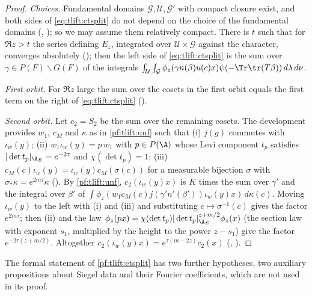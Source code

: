 \begin{proof}
\emph{Choices.} Fundamental domains $\mathcal G,\mathcal U,\mathcal G'$ with compact closure exist, and both sides of
\eqref{eq:tlift:ctsplit} do not depend on the choice of the fundamental domains
(,
); so we may assume them relatively compact. There is $t$
such that for $\Re z>t$ the series defining $E_z$, integrated over $\mathcal U\times\mathcal G$ against the character, converges
absolutely (); then the left side of
\eqref{eq:tlift:ctsplit} is the sum over $\gamma\in P(F)\backslash G(F)$ of the integrals
$\int_{\mathcal U}\int_{\mathcal G}\phi_z(\gamma n(\beta)u(c)x)\psi(-\Tr\tr(T\beta))\,d\lambda\,d\nu$.

\emph{First orbit.} For $\Re z$ large the sum over the cosets in the first orbit equals the first term on the right of
\eqref{eq:tlift:ctsplit} ().

\emph{Second orbit.} Let $c_2=S_2$ be the sum over the remaining cosets. The development provides $w_1$, $c_M$ and $\kappa$ as
in \cref{pf:tlift:unf} such that (i) $j(g)$ commutes with $\iota_w(y)$; (ii) $w_1\iota_w(y)=p\,w_1$ with $p\in P(\A)$ whose Levi
component $t_p$ satisfies $|\det t_p|_{\tliftAE}=e^{-2\tau}$ and $\chi(\det t_p)=1$; (iii) $c_M(c)\iota_w(y)=\iota_w(y)c_M(\sigma(c))$ for a
measurable bijection $\sigma$ with $\sigma_*\kappa=e^{2m\tau}\kappa$
(). By \cref{pf:tlift:unf}, $c_2(\iota_w(y)x)$ is $K$ times the
sum over $\gamma'$ and the integral over $\beta'$ of $\int\phi_z(w_1c_M(c)j(\gamma'n'(\beta'))\iota_w(y)x)\,d\kappa(c)$. Moving $\iota_w(y)$ to
the left with (i) and (iii) and substituting $c\mapsto\sigma^{-1}(c)$ gives the factor $e^{2m\tau}$; then (ii) and the law
$\phi_z(px)=\chi(\det t_p)|\det t_p|_{\tliftAE}^{z+m/2}\phi_z(x)$ (the section law with exponent $s_1$, multiplied by the
height to the power $z-s_1$) give the factor $e^{-2\tau(z+m/2)}$. Altogether $c_2(\iota_w(y)x)=e^{\tau(m-2z)}c_2(x)$
(,
).
\end{proof}

The formal statement of \cref{pf:tlift:ctsplit} has two further hypotheses, two auxiliary propositions about Siegel
data and their Fourier coefficients, which are not used in its proof.

